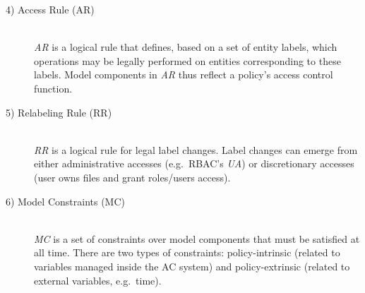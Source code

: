 \documentclass[twoside, openright, 12pt]{book}
\begin{document}
\begin{description}
\item[4) Access Rule (AR)]\hfill \\
\textit{AR} is a logical rule that defines, based on a set of entity labels, which operations may be legally performed on entities corresponding to these labels. Model components in \textit{AR} thus reflect a policy’s access control function.


\item[5) Relabeling Rule (RR)]\hfill \\
\textit{RR} is a logical rule for legal label changes.
Label changes can emerge from either administrative accesses (e.g.~RBAC's \textit{UA}) or discretionary accesses (user owns files and grant roles/users access).


\item[6) Model Constraints (MC)]\hfill \\
\textit{MC} is a set of constraints over model components that must be satisfied at all time.
There are two types of constraints: policy-intrinsic (related to variables managed inside the AC system) and policy-extrinsic (related to external variables, e.g.~time).

\end{description}
\end{document}
